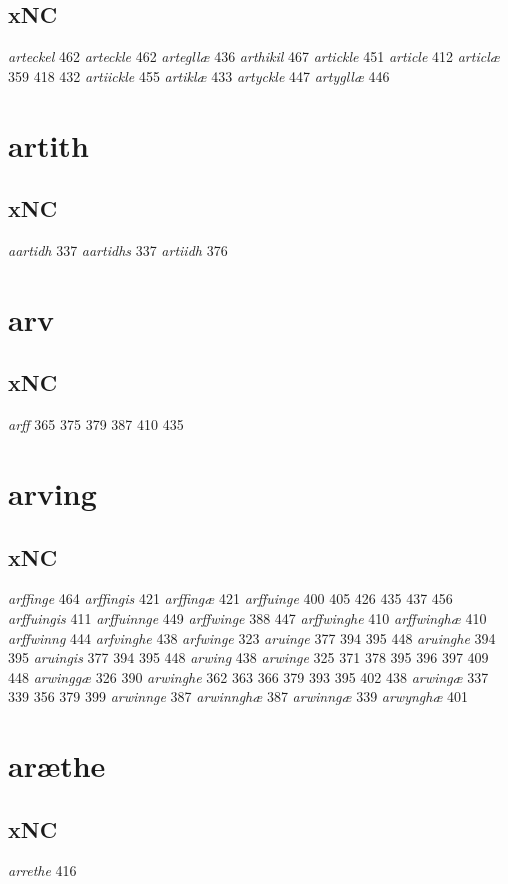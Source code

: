 \documentclass[a4paper,twocolumn]{article}
\begin{document}
\subsection{xNC}
\label{sec:org28c798f}
\emph{arteckel} 462 \emph{arteckle} 462 \emph{artegllæ} 436 \emph{arthikil} 467 \emph{artickle} 451 \emph{article} 412 \emph{articlæ} 359 418 432 \emph{artiickle} 455 \emph{artiklæ} 433 \emph{artyckle} 447 \emph{artygllæ} 446 
\section{artith}
\label{sec:org163ac19}
\subsection{xNC}
\label{sec:org9f40b0e}
\emph{aartidh} 337 \emph{aartidhs} 337 \emph{artiidh} 376 
\section{arv}
\label{sec:orgbca6d0c}
\subsection{xNC}
\label{sec:orgbadafe4}
\emph{arff} 365 375 379 387 410 435 
\section{arving}
\label{sec:orgd41e7ac}
\subsection{xNC}
\label{sec:org950009e}
\emph{arffinge} 464 \emph{arffingis} 421 \emph{arffingæ} 421 \emph{arffuinge} 400 405 426 435 437 456 \emph{arffuingis} 411 \emph{arffuinnge} 449 \emph{arffwinge} 388 447 \emph{arffwinghe} 410 \emph{arffwinghæ} 410 \emph{arffwinng} 444 \emph{arfvinghe} 438 \emph{arfwinge} 323 \emph{aruinge} 377 394 395 448 \emph{aruinghe} 394 395 \emph{aruingis} 377 394 395 448 \emph{arwing} 438 \emph{arwinge} 325 371 378 395 396 397 409 448 \emph{arwinggæ} 326 390 \emph{arwinghe} 362 363 366 379 393 395 402 438 \emph{arwingæ} 337 339 356 379 399 \emph{arwinnge} 387 \emph{arwinnghæ} 387 \emph{arwinngæ} 339 \emph{arwynghæ} 401 
\section{aræthe}
\label{sec:org8479f1d}
\subsection{xNC}
\label{sec:orgdadc7b9}
\emph{arrethe} 416 
\end{document}
